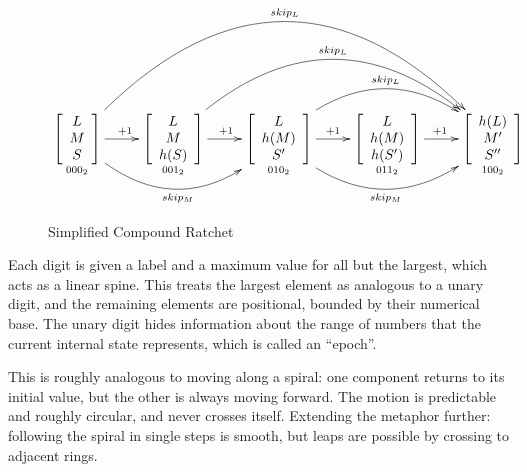 \documentclass{article}
\begin{document}
	\begin{figure}[h]
		\centering
		
		$\xymatrix{
		    \underset{000_{2}}{\left[ { \begin{array}{cc} L \\ M  \\ S \end{array} } \right]}
				\ar[r]^{+1}
				\ar@/_3pc/[rr]_{skip_{M}}
				\ar@/^7pc/[rrrr]^{skip_{L}}
    	 & \underset{001_{2}}{\left[ { \begin{array}{cc} L \\ M  \\ h(S) \end{array} } \right]}
	      		\ar[r]^{+1}
	      		\ar@/^4.75pc/[rrr]^{skip_{L}}
	     & \underset{010_{2}}{\left[ { \begin{array}{cc} L \\ h(M)  \\ S' \end{array} } \right]}
	      		\ar[r]^{+1}
	      		\ar@/_3pc/[rr]_{skip_{M}}
	      		\ar@/^3pc/[rr]^{skip_{L}}
    	 & \underset{011_{2}}{\left[ { \begin{array}{cc} L \\ h(M)  \\ h(S') \end{array} } \right]}
	      		\ar[r]^{+1}
	     & \underset{100_{2}}{\left[ { \begin{array}{cc} h(L) \\ M'  \\ S'' \end{array} } \right]}
		}$

		\caption{Simplified Compound Ratchet}
		\label{fig:compound-ratchet}
	\end{figure}

	Each digit is given a label and a maximum value for all but the largest, which acts as a linear spine. This treats the largest element as analogous to a unary digit, and the remaining elements are positional, bounded by their numerical base. The unary digit hides information about the range of numbers that the current internal state represents, which is called an ``epoch''.
	
	This is roughly analogous to moving along a spiral: one component returns to its initial value, but the other is always moving forward. The motion is predictable and roughly circular, and never crosses itself. Extending the metaphor further: following the spiral in single steps is smooth, but leaps are possible by crossing to adjacent rings.
	
\end{document}
